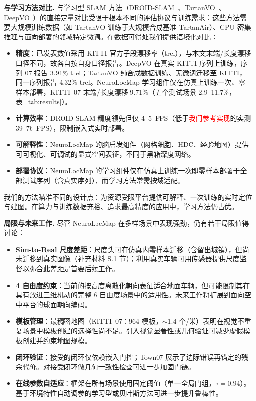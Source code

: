 \textbf{与学习方法对比.} 与学习型 SLAM 方法（DROID-SLAM~\cite{teed2021droid}、TartanVO~\cite{wang2021tartanvo}、DeepVO~\cite{wang2017deepvo}）的直接定量对比受限于根本不同的评估协议与训练需求：这些方法需要大规模训练数据（如 TartanVO 训练于大规模合成基准 TartanAir）、GPU 密集推理与面向部署的领域特定微调。在数据可得处我们提供语境化对比：

\begin{itemize}
    \item \textbf{精度}：已发表数值采用 KITTI 官方子段漂移率（trel），与本文末端/长度漂移口径不同，故各自按自身口径报告。DeepVO 在真实 KITTI 序列上训练，序列 07 报告 3.91\% trel；TartanVO 纯合成数据训练、无微调迁移至 KITTI，同一序列报告 4.32\% trel。NeuroLocMap 学习组件仅在仿真上训练一次、零样本部署，KITTI~07 末端/长度漂移 9.71\%（五个测试场景 2.9--11.7\%，表~\ref{tab:results}）。

    \item \textbf{计算效率}：DROID-SLAM 精度领先但仅 4--5~FPS（低于\textcolor{red}{我们参考实现}的实测 39--76~FPS），限制嵌入式实时部署。

    \item \textbf{可解释性}：NeuroLocMap 的脑启发组件（网格细胞、HDC、经验地图）提供可可视化、可调试的显式空间表征，不同于黑箱深度网络。

    \item \textbf{部署协议}：NeuroLocMap 的学习组件仅在仿真上训练一次即零样本部署于全部测试序列（含真实序列），而学习方法常需按域适配。
\end{itemize}

我们的方法瞄准不同的设计点：为资源受限平台提供可解释、一次训练的实时定位与建图。在算力与训练数据充裕、追求最高精度的应用中，学习方法仍占优。

\textbf{局限与未来工作.} 尽管 NeuroLocMap 在多样场景中表现强劲，仍有若干局限值得讨论：

\begin{itemize}
    \item \textbf{Sim-to-Real 尺度差距}：尺度头可在仿真内零样本迁移（含留出城镇），但尚未迁移到真实图像（补充材料 S.1 节）；利用真实车辆可用传感器提供尺度监督以弥合此差距是首要后续工作。

    \item \textbf{4 自由度约束}：当前的按高度离散化朝向表征适合地面车辆，但可能限制其在具有激进三维机动的完整 6 自由度场景中的适用性。未来工作将扩展到面向空中平台的球面朝向编码。

    \item \textbf{模板管理}：最稠密地图（KITTI~07：964 模板，$\sim$1.4 个/米）表明在视觉不重复场景中模板创建的选择性尚不足。引入视觉显著性或几何验证可减少虚假模板创建并约束地图规模。

    \item \textbf{闭环验证}：接受的闭环仅依赖嵌入门控；Town07 展示了边际错误再锚定的残余代价。对接受闭环做几何一致性检查可进一步加固门链。

    \item \textbf{在线参数自适应}：框架在所有场景使用固定阈值（单一全局门组，$\tau=0.94$）。基于环境特性自动调参的学习型或贝叶斯方法可进一步提升鲁棒性。
\end{itemize}
